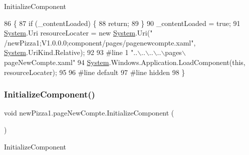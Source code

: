 Initialize\+Component 


\begin{DoxyCode}
86                                           \{
87             \textcolor{keywordflow}{if} (\_contentLoaded) \{
88                 \textcolor{keywordflow}{return};
89             \}
90             \_contentLoaded = \textcolor{keyword}{true};
91             \hyperlink{namespaceSystem}{System}.Uri resourceLocater = \textcolor{keyword}{new} \hyperlink{namespaceSystem}{System}.Uri(\textcolor{stringliteral}{"
      /newPizza1;V1.0.0.0;component/pages/pagenewcompte.xaml"}, \hyperlink{namespaceSystem}{System}.UriKind.Relative);
92             
93 \textcolor{preprocessor}{            #line 1 "..\(\backslash\)..\(\backslash\)..\(\backslash\)..\(\backslash\)pages\(\backslash\)pageNewCompte.xaml"
}
94             \hyperlink{namespaceSystem}{System}.Windows.Application.LoadComponent(\textcolor{keyword}{this}, resourceLocater);
95             
96 \textcolor{preprocessor}{            #line default
}
97 \textcolor{preprocessor}{            #line hidden
}
98         \}
\end{DoxyCode}
\mbox{\label{classnewPizza1_1_1pageNewCompte_a7469fdce60a25c385ac5b019b57a492a}} 
\subsubsection{\texorpdfstring{Initialize\+Component()}{InitializeComponent()}\hspace{0.1cm}{\footnotesize\ttfamily [2/2]}}
{\footnotesize\ttfamily void new\+Pizza1.\+page\+New\+Compte.\+Initialize\+Component (\begin{DoxyParamCaption}{ }\end{DoxyParamCaption})\hspace{0.3cm}{\ttfamily [inline]}}



Initialize\+Component 


